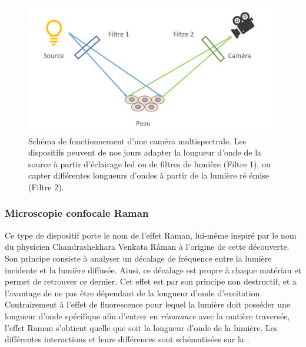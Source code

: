 \begin{figure}[H]
    \centering
    \includegraphics[width=\linewidth]{contents/chapter_2/resources/scheme_multispectral_principle.pdf}
    \caption{Schéma de fonctionnement d'une caméra multispectrale. Les dispositifs peuvent de nos jours adapter la longueur d'onde de la source à partir d'éclairage \gls{led} ou de filtres de lumière (Filtre 1), ou capter différentes longueurs d'ondes à partir de la lumière ré émise (Filtre 2).}
    \label{fig:scheme_multispectral_principle}
\end{figure}\par

\subsubsection{Microscopie confocale Raman}
Ce type de dispositif porte le nom de l'effet Raman, lui-même inspiré par le nom du physicien Chandrashekhara Venkata Râman à l'origine de cette découverte. Son principe consiste à analyser un décalage de fréquence entre la lumière incidente et la lumière diffusée. Ainsi, ce décalage est propre à chaque matériau et permet de retrouver ce dernier. Cet effet est par son principe non destructif, et a l'avantage de ne pas être dépendant de la longueur d'onde d'excitation. Contrairement à l'effet de fluorescence pour lequel la lumière doit posséder une longueur d'onde spécifique afin d'entrer en \textit{résonance} avec la matière traversée, l'effet Raman s'obtient quelle que soit la longueur d'onde de la lumière. Les différentes interactions et leurs différences sont schématisées sur la .\par

